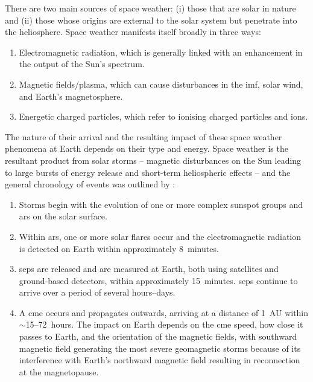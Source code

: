 There are two main sources of space weather: (i) those that are solar in nature and (ii) those whose origins are external to the solar system but penetrate into the heliosphere. Space weather manifests itself broadly in three ways:

\begin{enumerate}
	\item{Electromagnetic radiation, which is generally linked with an enhancement in the output of the Sun's spectrum.}
	
	\item{Magnetic fields/plasma, which can cause disturbances in the \gls{imf}, solar wind, and Earth's magnetosphere.}
	
	\item{Energetic charged particles, which refer to ionising charged particles and ions.}
\end{enumerate}

The nature of their arrival and the resulting impact of these space weather phenomena at Earth depends on their type and energy. Space weather is the resultant product from solar storms -- magnetic disturbances on the Sun leading to large bursts of energy release and short-term heliospheric effects -- and the general chronology of events was outlined by \citet{cannon_extreme_2013}:

\begin{enumerate}
	\item{Storms begin with the evolution of one or more complex sunspot groups and \glspl{ar} on the solar surface.}
	
	\item{Within \glspl{ar}, one or more solar flares occur and the electromagnetic radiation is detected on Earth within approximately 8~minutes.}
	
	\item{\glspl{sep} are released and are measured at Earth, both using satellites and ground-based detectors, within approximately 15~minutes. \glspl{sep} continue to arrive over a period of several hours--days.}
	
	\item{A \gls{cme} occurs and propagates outwards, arriving at a distance of 1~AU within $\sim$15--72~hours. The impact on Earth depends on the \gls{cme} speed, how close it passes to Earth, and the orientation of the magnetic fields, with southward magnetic field generating the most severe geomagnetic storms because of its interference with Earth's northward magnetic field resulting in reconnection at the magnetopause.}
	
\end{enumerate}

